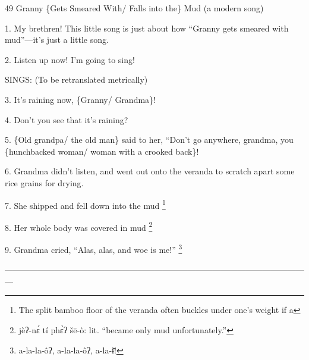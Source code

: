 
49 Granny \{Gets Smeared With/ Falls into the\} Mud (a modern song)

1. My brethren!  This little song is just about how ``Granny gets smeared with
mud''---it's just a little song.

2. Listen up now!  I'm going to sing!

SINGS: (To be retranslated metrically)

3. It's raining now, \{Granny/ Grandma\}!

4. Don't you see that it's raining?

5. \{Old grandpa/ the old man\} said to her, ``Don't go anywhere, grandma, you
\{hunchbacked woman/ woman with a crooked back\}!

6. Grandma didn't listen, and went out onto the veranda to scratch apart some rice
grains for drying.

7. She shipped and fell down into the mud \.\footnote{The split bamboo floor of the veranda often buckles under one's weight if a}

8. Her whole body was covered in mud \.\footnote{jèʔ-nɛ́ tí phɛ̀ʔ šē-ò: lit. ``became only mud unfortunately.''}

9. Grandma cried, ``Alas, alas, and woe is me!'' \footnote{a-la-la-ôʔ, a-la-la-ôʔ, a-la-ɨ̄!}

---------------------------------------------------------------------------------------------------------------

